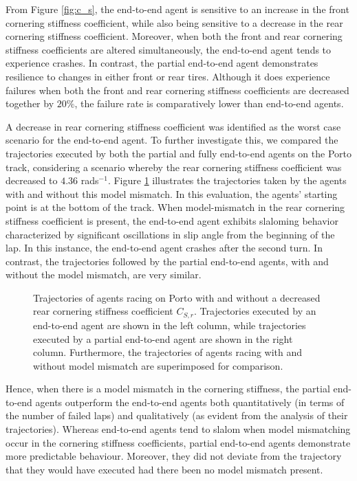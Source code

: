 From Figure \ref{fig:c_s}, the end-to-end agent is sensitive to an increase in the front cornering stiffness coefficient, while also being sensitive to a decrease in the rear cornering stiffness coefficient.
Moreover, when both the front and rear cornering stiffness coefficients are altered simultaneously, the end-to-end agent tends to experience crashes. 
In contrast, the partial end-to-end agent demonstrates resilience to changes in either front or rear tires.
Although it does experience failures when both the front and rear cornering stiffness coefficients are decreased together by $20\%$, the failure rate is comparatively lower than end-to-end agents.


A decrease in rear cornering stiffness coefficient was identified as the worst case scenario for the end-to-end agent.
To further investigate this, we compared the trajectories executed by both the partial and fully end-to-end agents on the Porto track, considering a scenario whereby the rear cornering stiffness coefficient was decreased to $4.36$ rads$^{-1}$. 
Figure \ref{fig:c_sr} illustrates the trajectories taken by the agents with and without this model mismatch. 
In this evaluation, the agents' starting point is at the bottom of the track. 
When model-mismatch in the rear cornering stiffness coefficient is present, the end-to-end agent exhibits slaloming behavior characterized by significant oscillations in slip angle from the beginning of the lap.
In this instance, the end-to-end agent crashes after the second turn. 
In contrast, the trajectories followed by the partial end-to-end agents, with and without the model mismatch, are very similar.


\begin{figure}[htb!]
    \centering
    
    \caption[Trajectories of agents racing with and without a decreased rear cornering stiffness coefficient]{Trajectories of agents racing on Porto with and without a decreased rear cornering stiffness coefficient $C_{S,r}$. Trajectories executed by an end-to-end agent are shown in the left column, while trajectories executed by a partial end-to-end agent are shown in the right column. Furthermore, the trajectories of agents racing with and without model mismatch are superimposed for comparison.}
    \label{fig:c_sr}
\end{figure}


Hence, when there is a model mismatch in the cornering stiffness, the partial end-to-end agents outperform the end-to-end agents both quantitatively (in terms of the number of failed laps) and qualitatively (as evident from the analysis of their trajectories).
Whereas end-to-end agents tend to slalom when model mismatching occur in the cornering stiffness coefficients, partial end-to-end agents demonstrate more predictable behaviour.
Moreover, they did not deviate from the trajectory that they would have executed had there been no model mismatch present.


